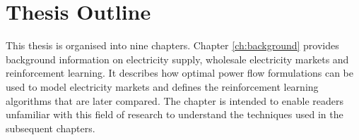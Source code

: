 

\section{Thesis Outline}
This thesis is organised into nine chapters.  Chapter \ref{ch:background}
provides background information on electricity supply, wholesale electricity
markets and reinforcement learning.  It describes how optimal power flow
formulations can be used to model electricity markets and defines the
reinforcement learning algorithms that are later compared. The chapter is
intended to enable readers unfamiliar with this field of research to understand
the techniques used in the subsequent chapters.

